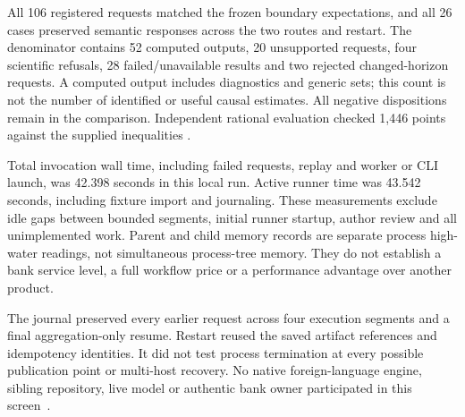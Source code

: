 All 106 registered requests matched the frozen boundary expectations, and
all 26 cases preserved semantic responses across the two routes and restart.
The denominator contains 52 computed outputs, 20 unsupported requests,
four scientific refusals, 28 failed/unavailable results and two rejected
changed-horizon requests. A computed output includes diagnostics and generic
sets; this count is not the number of identified or useful causal estimates.
All negative dispositions remain in the comparison. Independent rational
evaluation checked 1,446 points against the supplied inequalities
\citep{exec13_observation_run}.

Total invocation wall time, including failed requests, replay and worker or
CLI launch, was 42.398 seconds in this local run. Active runner
time was 43.542 seconds, including fixture import and journaling.
These measurements exclude idle gaps between bounded segments, initial
runner startup, author review and all unimplemented work. Parent and child
memory records are separate process high-water readings, not simultaneous
process-tree memory. They do not establish a bank service level, a full
workflow price or a performance advantage over another product.

The journal preserved every earlier request across four execution segments
and a final aggregation-only resume. Restart reused the saved artifact
references and idempotency identities. It did not test process termination
at every possible publication point or multi-host recovery. No native
foreign-language engine, sibling repository, live model or authentic bank
owner participated in this screen~\citep{exec13_observation_run}.

